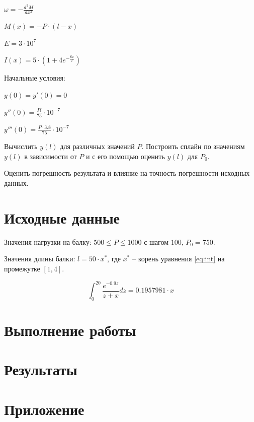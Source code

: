\begin{center}
\begin{multicols}{2}
$\omega = - \frac{d^2M}{dx^2}$

$M(x) = -P \cdot (l - x)$
\end{multicols}
\end{center}

\begin{center}
\begin{multicols}{2}
$E = 3\cdot 10^7$

$I(x) = 5 \cdot (1 + 4 e^{-\frac{6x}{l}})$
\end{multicols}
\end{center}

Начальные условия:
\begin{center}
\begin{multicols}{3}
$y(0) = y'(0) = 0$

$y''(0) = \frac{Pl}{75}\cdot 10^{-7}$

$y'''(0) = \frac{P \cdot 3.8}{75}\cdot 10^{-7}$
\end{multicols}
\end{center}

Вычислить $y(l)$ для различных значений $P$. Построить сплайн по значениям $y(l)$ в зависимости от $P$ и с его помощью оценить $y(l)$ для $P_0$. 

Оценить погрешность результата и влияние на точность погрешности исходных данных.

\section{Исходные данные}

Значения нагрузки на балку: $500 \le P \le 1000$ с шагом $100$, $P_0 = 750$.

Значения длины балки: $l = 50\cdot x^*$, где $x^*$ -- корень уравнения \ref{eq:int} на промежутке $[1, 4]$.

\begin{equation}\label{eq:int}
\int_0^{20} \frac{e^{-0.9z}}{z+x}dz = 0.1957981\cdot x
\end{equation}

\section{Выполнение работы}

\section{Результаты}

\section*{Приложение}





